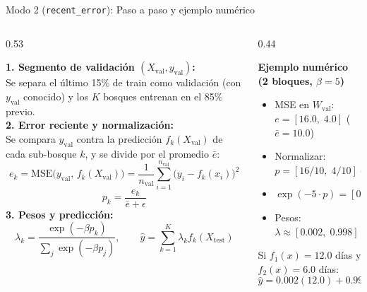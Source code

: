\documentclass[aspectratio=169,11pt,table]{beamer}
\begin{document}
\begin{frame}{Modo 2 (\texttt{recent\_error}): Paso a paso y ejemplo numérico}
\setlength{\abovedisplayskip}{2pt}
\setlength{\belowdisplayskip}{2pt}
\begin{columns}[T,onlytextwidth]
\begin{column}{0.53\textwidth}
\begin{ccdebox}[top=1mm,bottom=1mm]
\scriptsize
\textbf{1. Segmento de validación $(X_{\text{val}}, y_{\text{val}})$:}\\
Se separa el último 15\% de train como validación (con $y_{\text{val}}$ conocido) y los $K$ bosques entrenan en el 85\% previo.\\[0.08cm]
\textbf{2. Error reciente y normalización:}\\
Se compara $y_{\text{val}}$ contra la predicción $f_k(X_{\text{val}})$ de cada sub-bosque $k$, y se divide por el promedio $\bar{e}$:
\[e_k = \text{MSE}\big(y_{\text{val}},\, f_k(X_{\text{val}})\big) = \frac{1}{n_{\text{val}}}\sum_{i=1}^{n_{\text{val}}}\big(y_i - f_k(x_i)\big)^2\]
\[p_k = \frac{e_k}{\bar{e} + \epsilon}\]
\textbf{3. Pesos y predicción:}\\
\[\lambda_k = \frac{\exp(-\beta p_k)}{\sum_j \exp(-\beta p_j)}, \qquad \hat{y} = \sum_{k=1}^K \lambda_k f_k(X_{\text{test}})\]
\end{ccdebox}
\end{column}

\begin{column}{0.44\textwidth}
\begin{keybox}[top=1mm,bottom=1mm]
\scriptsize
\textbf{Ejemplo numérico (2 bloques, $\beta = 5$)}\\[0.06cm]
\begin{itemize}
  \item MSE en $W_{\text{val}}$: $e = [16.0,\; 4.0]$ ($\bar{e} = 10.0$)
  \item Normalizar: $p = [16/10,\; 4/10] = [1.6,\; 0.4]$
  \item $\exp(-5 \cdot p) = [0.0003,\; 0.135]$
  \item Pesos: $\lambda \approx [0.002,\; 0.998]$
\end{itemize}
\vspace{0.06cm}
Si $f_1(x) = 12.0$ días y $f_2(x) = 6.0$ días:
\[\hat{y} = 0.002(12.0) + 0.998(6.0) \approx \mathbf{6.01\text{ días}}\]
\end{keybox}
\end{column}
\end{columns}
\end{frame}
\end{document}
